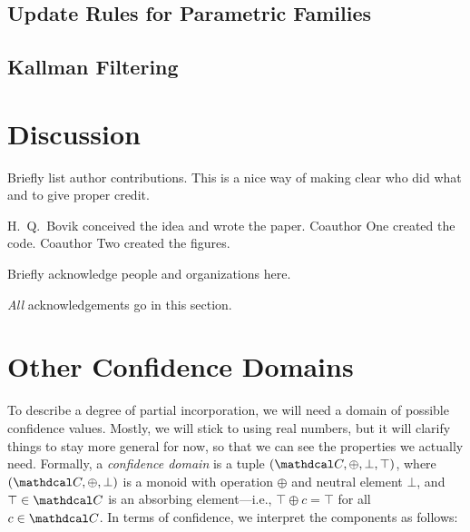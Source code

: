 \documentclass{uai2023}
\newif\ifbiblatex
\theoremstyle{plain}
\theoremstyle{definition}
\newcommand\confdom{\mathdcal C}
\begin{document}
 \subsection{Update Rules for Parametric Families}
\subsection{Kallman Filtering}

\section{Discussion}



\begin{contributions} Briefly list author contributions.
    This is a nice way of making clear who did what and to give proper credit.

    H.~Q.~Bovik conceived the idea and wrote the paper.
    Coauthor One created the code.
    Coauthor Two created the figures.
\end{contributions}

\begin{acknowledgements} Briefly acknowledge people and organizations here.

    \emph{All} acknowledgements go in this section.
\end{acknowledgements}

\ifbiblatex
\printbibliography
\else
    
\fi

\appendix
\onecolumn

\section{Other Confidence Domains}

To describe a degree of partial incorporation, we will need a domain of possible confidence values.
Mostly, we will stick to using real numbers, but it will clarify things to stay more general for now, so that we can see the properties we actually need.
Formally, a \emph{confidence domain} is a tuple $(\confdom, \oplus, \bot, \top)$,
where $(\confdom, \oplus, \bot)$ is a monoid with operation $\oplus$ and neutral element $\bot$, and $\top \in \confdom$ is an absorbing element---i.e., $\top \oplus c = \top$ for all $c \in \confdom$.
In terms of confidence, we interpret the components as follows:
\end{document}
